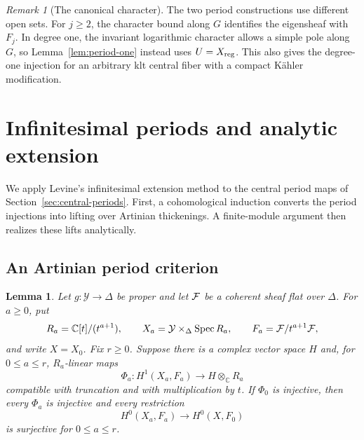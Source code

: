\documentclass[11pt,a4paper]{article}
\numberwithin{equation}{section}
\newtheorem{lemma}[theorem]{Lemma}
\theoremstyle{definition}
\theoremstyle{remark}
\newtheorem{remark}[theorem]{Remark}
\newcommand{\C}{\mathbb C}\newcommand{\Z}{\mathbb Z}
\newcommand{\cY}{\mathcal Y}\newcommand{\cB}{\mathcal B}
\newcommand{\Spec}{\operatorname{Spec}}\newcommand{\vol}{\operatorname{vol}}
\begin{document}
\begin{remark}[The canonical character]\label{rem:central-period-scope}
The two period constructions use different open sets. For $j\ge2$,
the character bound along $G$ identifies the eigensheaf with $F_j$.
In degree one, the invariant logarithmic character allows a simple
pole along $G$, so Lemma~\ref{lem:period-one} instead uses
$U=X_{\mathrm{reg}}$. This also gives the degree-one injection for an arbitrary
klt central fiber with a compact Kähler modification.
\end{remark}

\section{Infinitesimal periods and analytic extension}
\label{sec:endpoint}

We apply Levine's infinitesimal extension method
\cite{Levine1983,Levine1985} to the central period maps of
Section~\ref{sec:central-periods}. First, a cohomological induction
converts the period injections into lifting over Artinian thickenings.
A finite-module argument then realizes these lifts analytically.

\subsection{An Artinian period criterion}

\begin{lemma}\label{lem:artin-period}
Let $g:\cY\to\Delta$ be proper and let $\mathcal F$ be a coherent sheaf flat
over $\Delta$. For $a\ge0$, put
\[
 R_a=\C[t]/(t^{a+1}),\qquad
 X_a=\cY\times_\Delta\Spec R_a,\qquad
 F_a=\cF/t^{a+1}\cF,
\]
and write $X=X_0$. Fix $r\ge0$. Suppose there is a
complex vector space $H$ and, for $0\le a\le r$, $R_a$-linear maps
\[
 \Phi_a:H^1(X_a,F_a)\longrightarrow H\otimes_\C R_a
\]
compatible with truncation and with multiplication by $t$. If $\Phi_0$
is injective, then every $\Phi_a$ is injective and every restriction
\begin{equation}\label{eq:artin-surjection}
 H^0(X_a,F_a)\longrightarrow H^0(X,F_0)
\end{equation}
is surjective for $0\le a\le r$.
\end{lemma}
\end{document}
